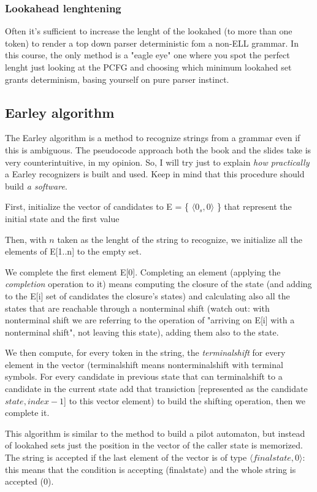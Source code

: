 			\subsubsection{Lookahead lenghtening}
				Often it's sufficient to increase the lenght of the lookahed (to more than one token) to render a top down parser deterministic fom a non-ELL grammar. 
				In this course, the only method is a "eagle eye" one where you spot the perfect lenght just looking at the PCFG and choosing which minimum lookahed 
				set grants determinism, basing yourself on pure parser instinct.
				
		\subsection{Earley algorithm}
			The Earley algorithm is a method to recognize strings from a grammar even if this is ambiguous. The pseudocode approach both the book and the slides take 
			is very counterintuitive, in my opinion. So, I will try just to explain \emph{how practically} a Earley recognizers is built and used. Keep in mind that 
			this procedure should build \emph{a software}.

			First, initialize the vector of candidates to E = \{ $\langle 0_s, 0 \rangle$ \} that represent the initial state and the first value

			Then, with $n$ taken as the lenght of the string to recognize, we initialize all the elements of E[1..n] to the empty set.

			We complete the first element E[0]. Completing an element (applying the \emph{completion} operation to it) means computing the closure of the state (and 
			adding to the E[i] set of candidates the closure's states) and calculating also all the states that are reachable through a nonterminal shift (watch out: 
			with nonterminal shift we are referring to the operation of "arriving on E[i] with a nonterminal shift", not leaving this state), adding them also to the 
			state.

			We then compute, for every token in the string, the \emph{terminalshift} for every element in the vector (terminalshift means nonterminalshift with 
			terminal symbols. For every candidate in previous state that can terminalshift to a candidate in the current state add that transiction [represented as 
			the candidate $state, index - 1$] to this vector element) to build the shifting operation, then we complete it.

			This algorithm is similar to the method to build a pilot automaton, but instead of lookahed sets just the position in the vector of the caller state is 
			memorized. The string is accepted if the last element of the vector is of type $\langle finalstate, 0 \rangle$: this means that the condition is 
			accepting (finalstate) and the whole string is accepted (0).
			
